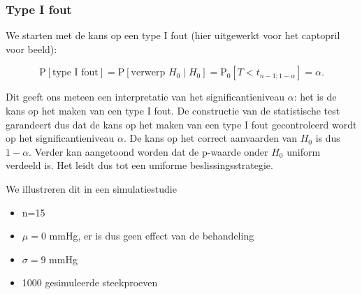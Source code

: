 \documentclass[
  dutch,
  letterpaper,
  12pt]{book}
\newenvironment{Shaded}{\begin{snugshade}}{\end{snugshade}}
\newcommand{\AttributeTok}[1]{\textcolor[rgb]{0.40,0.45,0.13}{#1}}
\newcommand{\CommentTok}[1]{\textcolor[rgb]{0.37,0.37,0.37}{#1}}
\newcommand{\ControlFlowTok}[1]{\textcolor[rgb]{0.00,0.23,0.31}{\textbf{#1}}}
\newcommand{\DecValTok}[1]{\textcolor[rgb]{0.68,0.00,0.00}{#1}}
\newcommand{\FloatTok}[1]{\textcolor[rgb]{0.68,0.00,0.00}{#1}}
\newcommand{\FunctionTok}[1]{\textcolor[rgb]{0.28,0.35,0.67}{#1}}
\newcommand{\NormalTok}[1]{\textcolor[rgb]{0.00,0.23,0.31}{#1}}
\newcommand{\OtherTok}[1]{\textcolor[rgb]{0.00,0.23,0.31}{#1}}
\newcommand{\SpecialCharTok}[1]{\textcolor[rgb]{0.37,0.37,0.37}{#1}}
\newcommand{\StringTok}[1]{\textcolor[rgb]{0.13,0.47,0.30}{#1}}
\providecommand{\tightlist}{%
  \setlength{\itemsep}{0pt}\setlength{\parskip}{0pt}}
\theoremstyle{definition}
\theoremstyle{definition}
\theoremstyle{definition}
\theoremstyle{remark}
\begin{document}
\subsubsection{Type I fout}\label{type-i-fout}

We starten met de kans op een type I fout (hier uitgewerkt voor het
captopril voor beeld):

\[\text{P}\left[\text{type I fout}\right]=\text{P}\left[\text{verwerp }H_0 \mid H_0\right] = \text{P}_0\left[T<t_{n-1;1-\alpha}\right]=\alpha.\]

Dit geeft ons meteen een interpretatie van het significantieniveau
\(\alpha\): het is de kans op het maken van een type I fout. De
constructie van de statistische test garandeert dus dat de kans op het
maken van een type I fout gecontroleerd wordt op het significantieniveau
\(\alpha\). De kans op het correct aanvaarden van \(H_0\) is dus
\(1-\alpha\). Verder kan aangetoond worden dat de p-waarde onder \(H_0\)
uniform verdeeld is. Het leidt dus tot een uniforme
beslissingsstrategie.

We illustreren dit in een simulatiestudie

\begin{itemize}
\tightlist
\item
  n=15
\item
  \(\mu=0\) mmHg, er is dus geen effect van de behandeling
\item
  \(\sigma =9\) mmHg
\item
  1000 gesimuleerde steekproeven
\end{itemize}

\begin{Shaded}
\end{Shaded}
\end{document}
